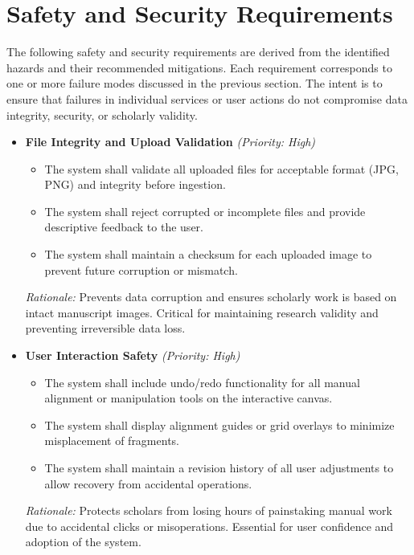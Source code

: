 \documentclass{article}
\begin{document}
\section{Safety and Security Requirements}

The following safety and security requirements are derived from the identified hazards and their recommended mitigations. Each requirement corresponds to one or more failure modes discussed in the previous section. The intent is to ensure that failures in individual services or user actions do not compromise data integrity, security, or scholarly validity.

\begin{itemize}

    \item \textbf{File Integrity and Upload Validation} \textit{(Priority: High)}
    \begin{itemize}
        \item The system shall validate all uploaded files for acceptable format (JPG, PNG) and integrity before ingestion.
        \item The system shall reject corrupted or incomplete files and provide descriptive feedback to the user.
        \item The system shall maintain a checksum for each uploaded image to prevent future corruption or mismatch.
    \end{itemize}
    \textit{Rationale:} Prevents data corruption and ensures scholarly work is based on intact manuscript images. Critical for maintaining research validity and preventing irreversible data loss.

    \item \textbf{User Interaction Safety} \textit{(Priority: High)}
    \begin{itemize}
        \item The system shall include undo/redo functionality for all manual alignment or manipulation tools on the interactive canvas.
        \item The system shall display alignment guides or grid overlays to minimize misplacement of fragments.
        \item The system shall maintain a revision history of all user adjustments to allow recovery from accidental operations.
    \end{itemize}
    \textit{Rationale:} Protects scholars from losing hours of painstaking manual work due to accidental clicks or misoperations. Essential for user confidence and adoption of the system.


\end{itemize}
\end{document}
